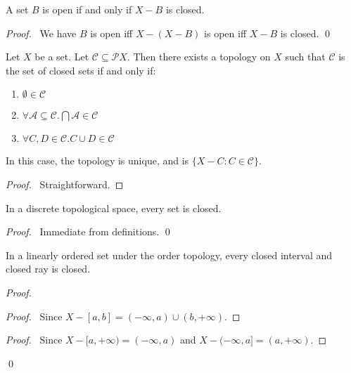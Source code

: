 \begin{prop}
A set $B$ is open if and only if $X - B$ is closed.
\end{prop}

\begin{proof}
\pf\ We have $B$ is open iff $X - (X - B)$ is open iff $X - B$ is closed. \qed
\end{proof}

\begin{thm}
Let $X$ be a set. Let $\mathcal{C} \subseteq \mathcal{P} X$. Then there exists a topology on $X$ such that $\mathcal{C}$ is the set of closed sets if and only if:
\begin{enumerate}
\item $\emptyset \in \mathcal{C}$
\item $\forall \mathcal{A} \subseteq \mathcal{C}. \bigcap \mathcal{A} \in \mathcal{C}$
\item $\forall C,D \in \mathcal{C}. C \cup D \in \mathcal{C}$
\end{enumerate}
In this case, the topology is unique, and is $\{ X - C : C \in \mathcal{C} \}$.
\end{thm}

\begin{proof}
\pf\ Straightforward.
\end{proof}

\begin{prop}
In a discrete topological space, every set is closed.
\end{prop}

\begin{proof}
\pf\ Immediate from definitions. \qed
\end{proof}

\begin{prop}
In a linearly ordered set under the order topology, every closed interval and closed ray is closed.
\end{prop}

\begin{proof}
\pf
{}
\begin{proof}
	\pf\ Since $X - [a,b] = (-\infty, a) \cup (b, +\infty)$.
\end{proof}
\begin{proof}
	\pf\ Since $X - [a,+\infty) = (-\infty,a)$ and $X - (-\infty,a] = (a,+\infty)$.
\end{proof}
\qed
\end{proof}

